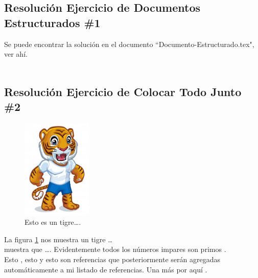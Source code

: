 \documentclass[10pt,a4paper]{article}
\begin{document}
\begin{center}
\section*{Resolución Ejercicio de Documentos Estructurados \#1}
\end{center}
Se puede encontrar la solución en el documento ``Documento-Estructurado.tex", ver ahí. \\
\\

\begin{center}
\section*{Resolución Ejercicio de Colocar Todo Junto \#2}
\end{center}

\begin{figure}
    \centering
    \includegraphics[width=0.3\textwidth,angle=180]{Resources/Tigre.jpg}
    \caption{\label{fig:tigre}Esto es un tigre\ldots.}
\end{figure}

La figura \ref{fig:tigre} nos muestra un tigre \ldots
\\

\citet{Brooks1997Methodology} muestra que \ldots. Evidentemente todos los n\'umeros impares son primos \citep{Jacobson1999Towards}.
\\

Esto \citet{Sutherland2003UNIVAC}, esto \citet{Taylor2003Influence} y esto \citet{Karthik2001Analysis} son referencias que posteriormente serán agregadas automáticamente a mi listado de referencias. Una más por aquí \citet{Smith1990Enabling}.




\end{document}
